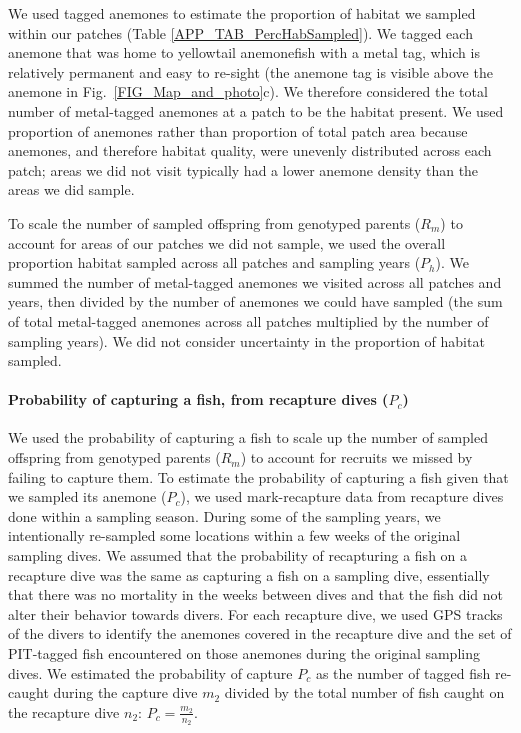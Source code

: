 \documentclass[12pt, oneside]{article}   	%
\begin{document}
We used tagged anemones to estimate the proportion of habitat we sampled within our patches (Table \ref{APP_TAB_PercHabSampled}). We tagged each anemone that was home to yellowtail anemonefish with a metal tag, which is relatively permanent and easy to re-sight (the anemone tag is visible above the anemone in Fig.\ \ref{FIG_Map_and_photo}c). We therefore considered the total number of metal-tagged anemones at a patch to be the habitat present. We used proportion of anemones rather than proportion of total patch area because anemones, and therefore habitat quality, were unevenly distributed across each patch; areas we did not visit typically had a lower anemone density than the areas we did sample. %

To scale the number of sampled offspring from genotyped parents ($R_m$) to account for areas of our patches we did not sample, we used the overall proportion habitat sampled across all patches and sampling years ($P_h$). We summed the number of metal-tagged anemones we visited across all patches and years, then divided by the number of anemones we could have sampled (the sum of total metal-tagged anemones across all patches multiplied by the number of sampling years). We did not consider uncertainty in the proportion of habitat sampled.

\paragraph*{Probability of capturing a fish, from recapture dives ($P_c$)} %

We used the probability of capturing a fish to scale up the number of sampled offspring from genotyped parents ($R_m$) to account for recruits we missed by failing to capture them. To estimate the probability of capturing a fish given that we sampled its anemone ($P_c$), we used mark-recapture data from recapture dives done within a sampling season. During some of the sampling years, we intentionally re-sampled some locations within a few weeks of the original sampling dives. We assumed that the probability of recapturing a fish on a recapture dive was the same as capturing a fish on a sampling dive, essentially that there was no mortality in the weeks between dives and that the fish did not alter their behavior towards divers. For each recapture dive, we used GPS tracks of the divers to identify the anemones covered in the recapture dive and the set of PIT-tagged fish encountered on those anemones during the original sampling dives. We estimated the probability of capture $P_c$ as the number of tagged fish re-caught during the capture dive $m_2$ divided by the total number of fish caught on the recapture dive $n_2$: $P_c = \frac{m_2}{n_2}$. %
\end{document}
